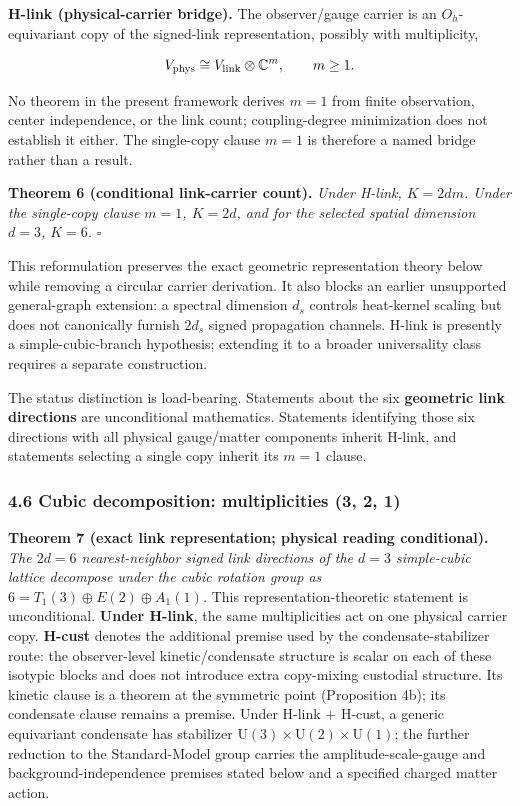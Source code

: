 \documentclass[
]{article}
\begin{document}
\textbf{H-link (physical-carrier bridge).} The observer/gauge carrier is
an \(O_h\)-equivariant copy of the signed-link representation, possibly
with multiplicity,

\[V_{\rm phys}\cong V_{\rm link}\otimes\mathbb C^m,\qquad m\ge1.\]

No theorem in the present framework derives \(m=1\) from finite
observation, center independence, or the link count; coupling-degree
minimization does not establish it either. The single-copy clause
\(m=1\) is therefore a named bridge rather than a result.

\textbf{Theorem 6 (conditional link-carrier count).} \emph{Under H-link,
\(K=2dm\). Under the single-copy clause \(m=1\), \(K=2d\), and for the
selected spatial dimension \(d=3\), \(K=6\).} \(\square\)

This reformulation preserves the exact geometric representation theory
below while removing a circular carrier derivation. It also blocks an
earlier unsupported general-graph extension: a spectral dimension
\(d_s\) controls heat-kernel scaling but does not canonically furnish
\(2d_s\) signed propagation channels. H-link is presently a
simple-cubic-branch hypothesis; extending it to a broader universality
class requires a separate construction.

The status distinction is load-bearing. Statements about the six
\textbf{geometric link directions} are unconditional mathematics.
Statements identifying those six directions with all physical
gauge/matter components inherit H-link, and statements selecting a
single copy inherit its \(m=1\) clause.

\hypertarget{cubic-decomposition-multiplicities-3-2-1}{%
\subsubsection{4.6 Cubic decomposition: multiplicities (3, 2,
1)}\label{cubic-decomposition-multiplicities-3-2-1}}

\textbf{Theorem 7 (exact link representation; physical reading
conditional).} \emph{The \(2d=6\) nearest-neighbor signed link
directions of the \(d=3\) simple-cubic lattice decompose under the cubic
rotation group as \(6=T_1(3)\oplus E(2)\oplus A_1(1)\).} This
representation-theoretic statement is unconditional. \textbf{Under
H-link}, the same multiplicities act on one physical carrier copy.
\textbf{H-cust} denotes the additional premise used by the
condensate-stabilizer route: the observer-level kinetic/condensate
structure is scalar on each of these isotypic blocks and does not
introduce extra copy-mixing custodial structure. Its kinetic clause is a
theorem at the symmetric point (Proposition 4b); its condensate clause
remains a premise. Under H-link + H-cust, a generic equivariant
condensate has stabilizer
\(\mathrm U(3)\times\mathrm U(2)\times\mathrm U(1)\); the further
reduction to the Standard-Model group carries the amplitude-scale-gauge
and background-independence premises stated below and a specified
charged matter action.
\end{document}
